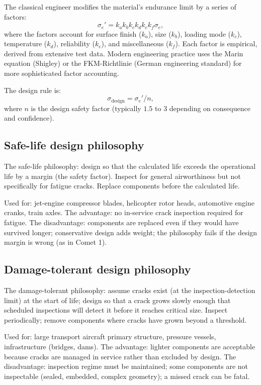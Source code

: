 The classical engineer modifies the material's endurance limit by a series of factors:
\[
\sigma_e' = k_a k_b k_c k_d k_e k_f \sigma_e,
\]
where the factors account for surface finish ($k_a$), size ($k_b$), loading mode ($k_c$), temperature ($k_d$), reliability ($k_e$), and miscellaneous ($k_f$). Each factor is empirical, derived from extensive test data. Modern engineering practice uses the Marin equation (Shigley) or the FKM-Richtlinie (German engineering standard) for more sophisticated factor accounting.

The design rule is:
\[
\sigma_{\mathrm{design}} = \sigma_e' / n,
\]
where $n$ is the design safety factor (typically $1.5$ to $3$ depending on consequence and confidence).

\subsection{Safe-life design philosophy}

The safe-life philosophy: design so that the calculated life exceeds the operational life by a margin (the safety factor). Inspect for general airworthiness but not specifically for fatigue cracks. Replace components before the calculated life.

Used for: jet-engine compressor blades, helicopter rotor heads, automotive engine cranks, train axles. The advantage: no in-service crack inspection required for fatigue. The disadvantage: components are replaced even if they would have survived longer; conservative design adds weight; the philosophy fails if the design margin is wrong (as in Comet 1).

\subsection{Damage-tolerant design philosophy}

The damage-tolerant philosophy: assume cracks exist (at the inspection-detection limit) at the start of life; design so that a crack grows slowly enough that scheduled inspections will detect it before it reaches critical size. Inspect periodically; remove components where cracks have grown beyond a threshold.

Used for: large transport aircraft primary structure, pressure vessels, infrastructure (bridges, dams). The advantage: lighter components are acceptable because cracks are managed in service rather than excluded by design. The disadvantage: inspection regime must be maintained; some components are not inspectable (sealed, embedded, complex geometry); a missed crack can be fatal.


